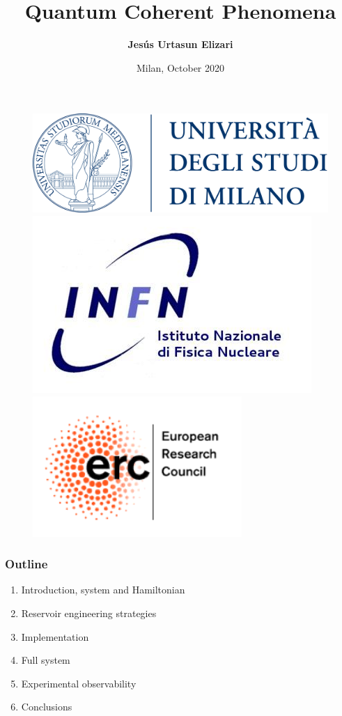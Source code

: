 \documentclass[aspectratio=43]{beamer}
\title[QCD and Monte Carlo]{Quantum Coherent Phenomena}
\author{\textbf {Jes\'us Urtasun Elizari}}
\date{Milan, October 2020}
\begin{document}
\begin{frame}

	\vspace{1.0 cm}
	
	
	\vspace{0.25 cm}

	\begin{figure}
		\includegraphics[width = 3.0 cm]{plots/logo_unimi.png}
		\hfill
		\includegraphics[width = 3.0 cm]{plots/logo_infn.png}
		\hfill
		\includegraphics[width = 3.0 cm]{plots/logo_erc.png}
		\endminipage
	\end{figure}

	\vspace{1.0 cm}

\end{frame}

\begin{frame}

	\frametitle{Outline}
	
	\begin{enumerate}
		\item {\color{blue}Introduction, system and Hamiltonian}
		\item {\color{blue}Reservoir engineering strategies}
		\item {\color{blue}Implementation}
		\item {\color{blue}Full system}
		\item {\color{blue}Experimental observability}
		\item {\color{blue}Conclusions}
	\end{enumerate}
	
\end{frame}
\end{document}
